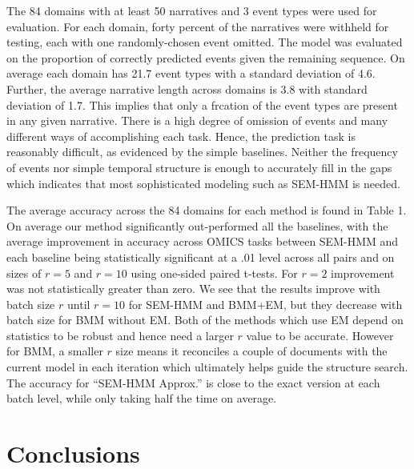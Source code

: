 \documentclass[letterpaper]{article}
\begin{document}
\vspace{-0.80mm}
The 84 domains with at least 50 narratives and 3 event types were used for evaluation.
For each domain, forty percent of the narratives were withheld for testing, each with one randomly-chosen event omitted.  The model was evaluated on the proportion of correctly predicted events given the remaining sequence.
On average each domain has 21.7 event types with a standard deviation of 4.6.  Further, the average narrative length across domains is 3.8 with standard deviation of 1.7.  This implies that
only a frcation of the event types are present in any given narrative.
There is a high degree of omission of events and many different ways of accomplishing each task.
Hence, the prediction task is reasonably difficult, as evidenced by the simple baselines.
Neither the frequency of events nor simple temporal structure is enough to accurately fill in the gaps which indicates that most sophisticated modeling such as SEM-HMM is needed.

The average accuracy across the 84 domains for each method is found in Table 1.
On average our method significantly out-performed all the baselines, with the average improvement in accuracy across OMICS tasks between SEM-HMM and each baseline being statistically significant at a .01 level across all pairs and on sizes of $r = 5$ and $r= 10$ using one-sided paired t-tests.  For $r=2$ improvement was not statistically greater than zero. %
We see that the results improve with batch size $r$ until $r=10$ for
SEM-HMM and BMM+EM, but they decrease with batch size for BMM without EM.
Both of the methods which use EM depend on statistics to be robust and hence need a larger $r$ value to be accurate.  However for BMM, a smaller $r$ size means it reconciles a couple of documents with the current model in each iteration which ultimately helps guide the structure search.
The accuracy for ``SEM-HMM Approx.'' is close to the exact version at each batch level, while only taking half the time on average.




\vspace{-1.67mm}
\section{Conclusions}
\end{document}
